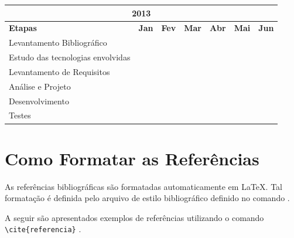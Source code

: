 \documentclass[12pt]{article}
\begin{document}
\newcommand{\corCronograma}{yellow}
\begin{center}
	\begin{tabular}{|p{6cm}|p{1cm}|p{1cm}|p{1cm}|p{1cm}|p{1cm}|p{1cm}|}  %
  \hline
    \multicolumn{7}{c}{2013}\\
  \hline
  	\textbf{Etapas}&
  	\textbf{Jan}&
  	\textbf{Fev}&
  	\textbf{Mar}&
  	\textbf{Abr}&
  	\textbf{Mai}&
  	\textbf{Jun}
  	\\
  \hline
  Levantamento Bibliográfico &
  \cellcolor{\corCronograma} & & & & & 
  \\
  \hline
  Estudo das tecnologias envolvidas &
  & \cellcolor{\corCronograma} & & & & 
  \\
  \hline
  Levantamento de Requisitos &
  & & \cellcolor{\corCronograma} & & & 
  \\
  \hline
  Análise e Projeto &
  & & & \cellcolor{\corCronograma} & \cellcolor{\corCronograma} & \cellcolor{\corCronograma}
  \\
  \hline
  Desenvolvimento &
  & & & \cellcolor{\corCronograma} & \cellcolor{\corCronograma} & \cellcolor{\corCronograma}
  \\
  \hline
  Testes &
  & & & \cellcolor{\corCronograma} & \cellcolor{\corCronograma} & \cellcolor{\corCronograma}
  \\  
  \hline
	\end{tabular}
	\label{tab:cronograma}
\end{center}

\section{Como Formatar as Referências} \label{sec:formatarReferencias}

As referências bibliográficas são formatadas automaticamente em LaTeX.
Tal formatação é definida pelo arquivo de estilo bibliográfico definido no comando \verb!!. 

A seguir são apresentados exemplos de referências utilizando o comando \verb|\cite{referencia}| \cite{ncluasoap} \cite{tic2009}.



\end{document}
